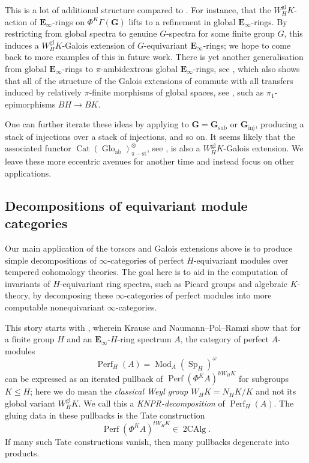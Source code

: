 \documentclass[11pt, a4paper]{article}
\newcommand{\ab}{\mathrm{ab}}
\newcommand{\gl}{\mathrm{gl}}
\newcommand{\inj}{\mathrm{inj}}
\newcommand{\sub}{\mathrm{sub}}
\newcommand{\st}{\mathrm{st}}
\newcommand{\1}{\mathbf{1}}
\DeclareMathOperator{\tworing}{2CAlg}
\DeclareMathOperator{\Cat}{Cat}
\DeclareMathOperator{\Glo}{Glo}
\DeclareMathOperator{\Mod}{Mod}
\DeclareMathOperator{\Perf}{Perf}
\DeclareMathOperator{\Sp}{Sp}
\newcommand{\E}{\mathbf{E}}
\newcommand{\G}{\mathbf{G}}
\newcommand{\Ga}{\Gamma}
\theoremstyle{plain}
\theoremstyle{definition}
\theoremstyle{remark}\numberwithin{equation}{section}
\begin{document}
This is a lot of additional structure compared to . For instance, that the $W_H^\gl K$-action of $\E_\infty$-rings on $\Phi^K \Ga(\G)$ lifts to a refinement in global $\E_\infty$-rings. By restricting from global spectra to genuine $G$-spectra for some finite group $G$, this induces a $W_H^\gl K$-Galois extension of $G$-equivariant $\E_\infty$-rings; we hope to come back to more examples of this in future work. There is yet another generalisation from global $\E_\infty$-rings to $\pi$-ambidextrous global $\E_\infty$-rings, see , which also shows that all of the structure of the Galois extensions of  commute with all transfers induced by relatively $\pi$-finite morphisms of global spaces, see \cite[]{ec3}, such as $\pi_1$-epimorphisms $BH \to BK$.

One can further iterate these ideas by applying  to $\G=\G_\sub$ or $\G_\inj$, producing a stack of injections over a stack of injections, and so on. It seems likely that the associated functor $\Cat(\Glo_\ab)^\otimes_{\pi-\st}$, see \cite[Df.1.3.1]{temperedglobal}, is also a $W_H^\gl K$-Galois extension. We leave these more eccentric avenues for another time and instead focus on other applications.

\subsection*{Decompositions of equivariant module categories}
Our main application of the torsors and Galois extensions above is to produce simple decompositions of $\infty$-categories of perfect $H$-equivariant modules over tempered cohomology theories. The goal here is to aid in the computation of invariants of $H$-equivariant ring spectra, such as Picard groups and algebraic $K$-theory, by decomposing these $\infty$-categories of perfect modules into more computable nonequivariant $\infty$-categories.

This story starts with \cite{krause_equivariantpicard,NPR2024}, wherein Krause and Naumann--Pol--Ramzi show that for a finite group $H$ and an $\E_\infty$-$H$-ring spectrum $A$, the category of perfect $A$-modules
\[\Perf_H(A) = \Mod_A(\Sp_H)^\omega\]
can be expressed as an iterated pullback of $\Perf(\Phi^K A)^{hW_H K}$ for subgroups $K\leq H$; here we do mean the \emph{classical Weyl group} $W_H K = N_H K / K$ and not its global variant $W_H^\gl K$. We call this a \emph{KNPR-decomposition} of $\Perf_H(A)$. The gluing data in these pullbacks is the Tate construction
\[\Perf(\Phi^K A)^{tW_H K} \in \tworing.\]
If many such Tate constructions vanish, then many pullbacks degenerate into products.
\end{document}

